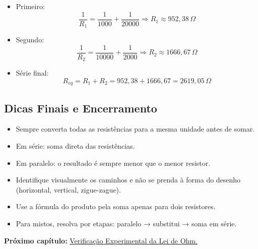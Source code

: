 \begin{itemize}
    \item Primeiro:
    \[
    \frac{1}{R_1} = \frac{1}{1000} + \frac{1}{20000} \Rightarrow R_1 \approx 952{,}38\,\Omega
    \]
    \item Segundo:
    \[
    \frac{1}{R_2} = \frac{1}{10000} + \frac{1}{2000} \Rightarrow R_2 \approx 1666{,}67\,\Omega
    \]
    \item Série final:
    \[
    R_{eq} = R_1 + R_2 = 952{,}38 + 1666{,}67 = 2619{,}05\,\Omega
    \]
\end{itemize}

\subsection{Dicas Finais e Encerramento}
\begin{itemize}
    \item Sempre converta todas as resistências para a mesma unidade antes de somar.
    \item Em série: soma direta das resistências.
    \item Em paralelo: o resultado é sempre menor que o menor resistor.
    \item Identifique visualmente os caminhos e não se prenda à forma do desenho (horizontal, vertical, zigue-zague).
    \item Use a fórmula do produto pela soma apenas para dois resistores.
    \item Para mistos, resolva por etapas: paralelo → substitui → soma em série.
\end{itemize}

\vspace{0.5cm}
\noindent\textbf{Próximo capítulo:} \hyperref[cap5]{Verificação Experimental da Lei de Ohm.}